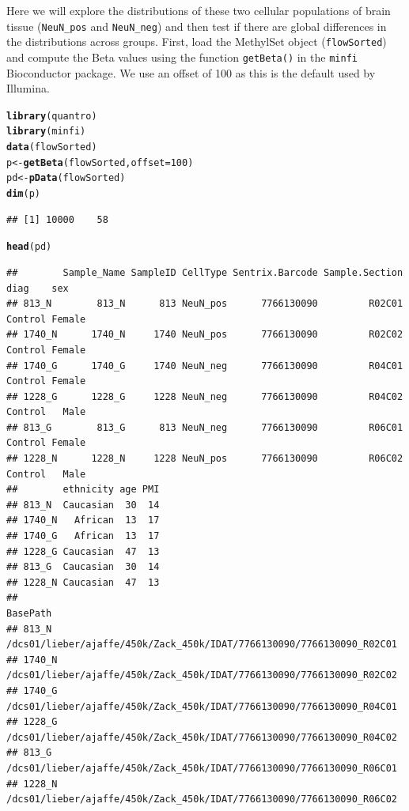 \documentclass{article}\usepackage[]{graphicx}\usepackage[usenames,dvipsnames]{color}
\makeatletter
\newcommand{\hlnum}[1]{\textcolor[rgb]{0.686,0.059,0.569}{#1}}%
\newcommand{\hlstd}[1]{\textcolor[rgb]{0.345,0.345,0.345}{#1}}%
\newcommand{\hlkwb}[1]{\textcolor[rgb]{0.69,0.353,0.396}{#1}}%
\newcommand{\hlkwc}[1]{\textcolor[rgb]{0.333,0.667,0.333}{#1}}%
\newcommand{\hlkwd}[1]{\textcolor[rgb]{0.737,0.353,0.396}{\textbf{#1}}}%
\newenvironment{kframe}{%
 \def\at@end@of@kframe{}%
 \ifinner\ifhmode%
  \def\at@end@of@kframe{\end{minipage}}%
  \begin{minipage}{\columnwidth}%
 \fi\fi%
 \def\FrameCommand##1{\hskip\@totalleftmargin \hskip-\fboxsep
 \colorbox{shadecolor}{##1}\hskip-\fboxsep
     \hskip-\linewidth \hskip-\@totalleftmargin \hskip\columnwidth}%
 \MakeFramed {\advance\hsize-\width
   \@totalleftmargin\z@ \linewidth\hsize
   \@setminipage}}%
 {\par\unskip\endMakeFramed%
 \at@end@of@kframe}
\newenvironment{knitrout}{}{} %
\makeatother
\begin{document}
Here we will explore the distributions of these two cellular populations of 
brain tissue (\verb+NeuN_pos+ and \verb+NeuN_neg+) and then test if there 
are global differences in the distributions across groups. First, load the 
MethylSet object (\texttt{flowSorted}) and compute the Beta values using 
the function \texttt{getBeta()} in the \texttt{minfi} Bioconductor package. 
We use an offset of 100 as this is the default used by Illumina. 

\begin{knitrout}
\color{fgcolor}\begin{kframe}
\begin{alltt}
\hlkwd{library}\hlstd{(quantro)}
\hlkwd{library}\hlstd{(minfi)}
\hlkwd{data}\hlstd{(flowSorted)}
\hlstd{p} \hlkwb{<-} \hlkwd{getBeta}\hlstd{(flowSorted,} \hlkwc{offset} \hlstd{=} \hlnum{100}\hlstd{)}
\hlstd{pd} \hlkwb{<-} \hlkwd{pData}\hlstd{(flowSorted)}
\hlkwd{dim}\hlstd{(p)}
\end{alltt}
\begin{verbatim}
## [1] 10000    58
\end{verbatim}
\begin{alltt}
\hlkwd{head}\hlstd{(pd)}
\end{alltt}
\begin{verbatim}
##        Sample_Name SampleID CellType Sentrix.Barcode Sample.Section    diag    sex
## 813_N        813_N      813 NeuN_pos      7766130090         R02C01 Control Female
## 1740_N      1740_N     1740 NeuN_pos      7766130090         R02C02 Control Female
## 1740_G      1740_G     1740 NeuN_neg      7766130090         R04C01 Control Female
## 1228_G      1228_G     1228 NeuN_neg      7766130090         R04C02 Control   Male
## 813_G        813_G      813 NeuN_neg      7766130090         R06C01 Control Female
## 1228_N      1228_N     1228 NeuN_pos      7766130090         R06C02 Control   Male
##        ethnicity age PMI
## 813_N  Caucasian  30  14
## 1740_N   African  13  17
## 1740_G   African  13  17
## 1228_G Caucasian  47  13
## 813_G  Caucasian  30  14
## 1228_N Caucasian  47  13
##                                                                     BasePath
## 813_N  /dcs01/lieber/ajaffe/450k/Zack_450k/IDAT/7766130090/7766130090_R02C01
## 1740_N /dcs01/lieber/ajaffe/450k/Zack_450k/IDAT/7766130090/7766130090_R02C02
## 1740_G /dcs01/lieber/ajaffe/450k/Zack_450k/IDAT/7766130090/7766130090_R04C01
## 1228_G /dcs01/lieber/ajaffe/450k/Zack_450k/IDAT/7766130090/7766130090_R04C02
## 813_G  /dcs01/lieber/ajaffe/450k/Zack_450k/IDAT/7766130090/7766130090_R06C01
## 1228_N /dcs01/lieber/ajaffe/450k/Zack_450k/IDAT/7766130090/7766130090_R06C02
\end{verbatim}
\end{kframe}
\end{knitrout}
\end{document}
